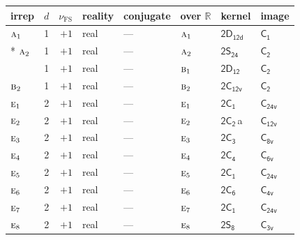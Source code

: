 \documentclass[10pt,a4paper]{article}
\numberwithin{equation}{section}
\newcommand{\grp}[1]{\mathsf{#1}}
\newcommand{\irr}[1]{\text{\normalfont\scshape #1}}
\newcommand{\detbox}[1]{{\setlength{\fboxsep}{1pt}\fbox{#1}}}
\newcommand{\clsletter}[1]{\,{\scriptsize\color{black!55}#1}}
\newcommand{\fsind}{\nu_{\mathrm{FS}}}
\begin{document}
\setlength{\emergencystretch}{2em}\par\setlength{\emergencystretch}{0pt}
{\small\renewcommand{\arraystretch}{1.25}\setlength{\tabcolsep}{4pt}\begin{longtable}{@{}lrrlllll@{}}\toprule
irrep & $d$ & $\fsind$ & reality & conjugate & over $\mathbb{R}$ & kernel & image\\\midrule\endhead
\bottomrule\endfoot\endlastfoot
$\irr{a}_{1}$ & 1 & $+1$ & real & --- & $\irr{a}_{1}$ & \href{2D12d.pdf}{$\grp{2D_{12d}}$} & \href{../../../rotation/data/pdf/C1.pdf}{$\grp{C_{1}}$}\\*
$\irr{a}_{2}$ & 1 & $+1$ & real & --- & $\irr{a}_{2}$ & \href{2S24.pdf}{$\grp{2S_{24}}$} & \href{../../../rotation/data/pdf/C2.pdf}{$\grp{C_{2}}$}\\
\detbox{$\irr{b}_{1}$} & 1 & $+1$ & real & --- & $\irr{b}_{1}$ & \href{2D12.pdf}{$\grp{2D_{12}}$} & \href{../../../rotation/data/pdf/C2.pdf}{$\grp{C_{2}}$}\\
$\irr{b}_{2}$ & 1 & $+1$ & real & --- & $\irr{b}_{2}$ & \href{2C12v.pdf}{$\grp{2C_{12v}}$} & \href{../../../rotation/data/pdf/C2.pdf}{$\grp{C_{2}}$}\\
$\irr{e}_{1}$ & 2 & $+1$ & real & --- & $\irr{e}_{1}$ & \href{2C1.pdf}{$\grp{2C_{1}}$} & $\grp{C_{24v}}$\\
$\irr{e}_{2}$ & 2 & $+1$ & real & --- & $\irr{e}_{2}$ & \href{2C2.pdf}{$\grp{2C_{2}}$}\clsletter{a} & \href{../../../rotation/data/pdf/C12v.pdf}{$\grp{C_{12v}}$}\\
$\irr{e}_{3}$ & 2 & $+1$ & real & --- & $\irr{e}_{3}$ & \href{2C3.pdf}{$\grp{2C_{3}}$} & \href{../../../rotation/data/pdf/C8v.pdf}{$\grp{C_{8v}}$}\\
$\irr{e}_{4}$ & 2 & $+1$ & real & --- & $\irr{e}_{4}$ & \href{2C4.pdf}{$\grp{2C_{4}}$} & \href{../../../rotation/data/pdf/C6v.pdf}{$\grp{C_{6v}}$}\\
$\irr{e}_{5}$ & 2 & $+1$ & real & --- & $\irr{e}_{5}$ & \href{2C1.pdf}{$\grp{2C_{1}}$} & $\grp{C_{24v}}$\\
$\irr{e}_{6}$ & 2 & $+1$ & real & --- & $\irr{e}_{6}$ & \href{2C6.pdf}{$\grp{2C_{6}}$} & \href{../../../rotation/data/pdf/C4v.pdf}{$\grp{C_{4v}}$}\\
$\irr{e}_{7}$ & 2 & $+1$ & real & --- & $\irr{e}_{7}$ & \href{2C1.pdf}{$\grp{2C_{1}}$} & $\grp{C_{24v}}$\\
$\irr{e}_{8}$ & 2 & $+1$ & real & --- & $\irr{e}_{8}$ & \href{2S8.pdf}{$\grp{2S_{8}}$} & \href{../../../rotation/data/pdf/C3v.pdf}{$\grp{C_{3v}}$}\\

\end{longtable}}
\end{document}
